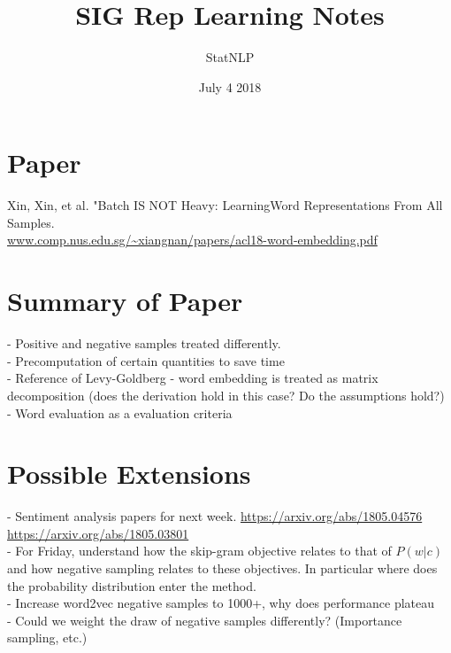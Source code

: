 \documentclass{article}
\title{SIG Rep Learning Notes}
\author{StatNLP}
\date{July 4 2018}
\begin{document}
\maketitle

\section{Paper}
Xin, Xin, et al. "Batch IS NOT Heavy: LearningWord Representations From All Samples. \\ \url{www.comp.nus.edu.sg/~xiangnan/papers/acl18-word-embedding.pdf}\\

\section{Summary of Paper}
- Positive and negative samples treated differently. \\
- Precomputation of certain quantities to save time \\
- Reference of Levy-Goldberg - word embedding is treated as matrix decomposition (does the derivation hold in this case? Do the assumptions hold?) \\
- Word evaluation as a evaluation criteria \\

\section{Possible Extensions}
- Sentiment analysis papers for next week. \url{https://arxiv.org/abs/1805.04576} \url{https://arxiv.org/abs/1805.03801}\\
- For Friday, understand how the skip-gram objective relates to that of $P(w|c)$ and how negative sampling relates to these objectives. In particular where does the probability distribution enter the method. \\
- Increase word2vec negative samples to 1000+, why does performance plateau \\
- Could we weight the draw of negative samples differently? (Importance sampling, etc.)
\end{document}
